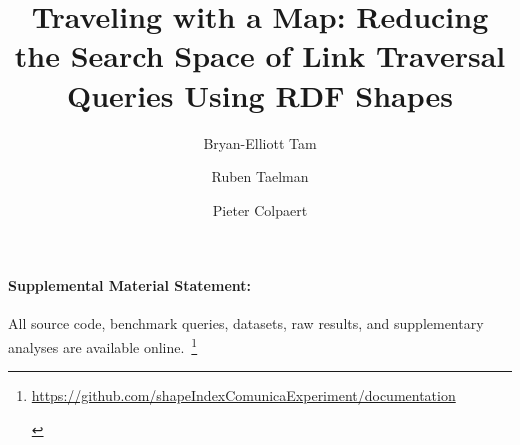 \documentclass[runningheads]{llncs}
\newif\ifanonymous
\begin{document}
%
\title{Traveling with a Map: Reducing the Search Space of Link Traversal Queries Using RDF Shapes}
%
%
\ifanonymous
    \author{Anonymous}
\else
    \author{Bryan-Elliott Tam \and
    Ruben Taelman \and
    Pieter Colpaert}
\fi


%
\maketitle              %
%











\paragraph*{Supplemental Material Statement:}\label{sec:supplementalMaterial} All source code, benchmark queries, datasets, raw results, and supplementary analyses are available online.~\footnote{
    \ifanonymous
       \url{https://anonymous.4open.science/r/documentation-1A65}
    \else
       \url{https://github.com/shapeIndexComunicaExperiment/documentation}
    \fi 
    \label{sf:supplementalMaterial}}
%


\printbibliography
{}
\end{document}
